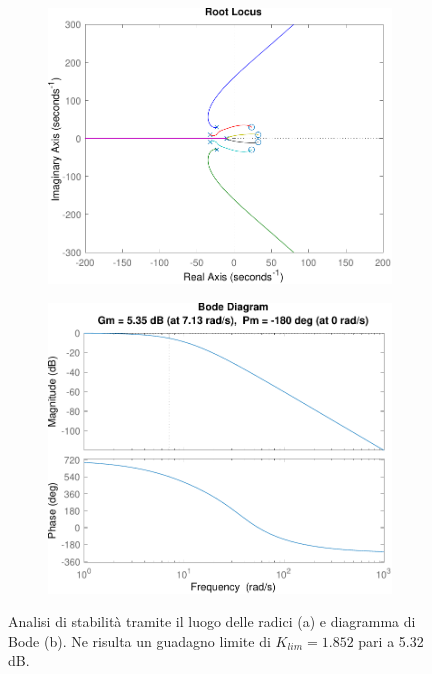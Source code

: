 \begin{figure}[t!]
	\begin{subfigure}{0.5\linewidth}
		\centering
		\includegraphics[width=0.9\linewidth]{../code/pupillary/sine/figs/rlocus}
		\caption{}
	\end{subfigure}\hfill
	\begin{subfigure}{0.5\linewidth}
		\centering
		\includegraphics[width=0.9\linewidth]{../code/pupillary/sine/figs/margin}
		\caption{}
	\end{subfigure}\hfill
	\caption{Analisi di stabilità tramite il luogo delle radici (a) e diagramma di Bode (b). Ne risulta un guadagno limite di $K_{lim}=1.852$ pari a 5.32 dB.}
	\label{fig:pup_stabilit}
\end{figure}

